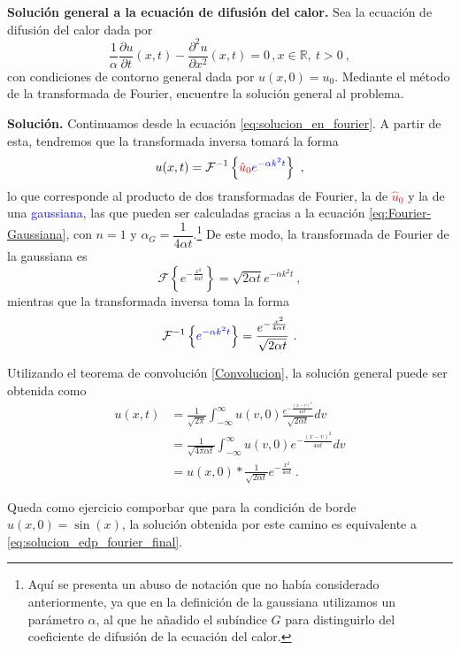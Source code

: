 \begin{ejemplo}
    \textbf{Solución general a la ecuación de difusión del calor.} Sea la ecuación de difusión del calor dada por
    \begin{equation}
        \frac{1}{\alpha} \frac{\partial u}{\partial t} (x,t) - \frac{\partial^2 u}{\partial x^2}(x,t) = 0 \, , x \in \mathbb{R}, \ t>0 \ ,
    \end{equation}
    con condiciones de contorno general dada por $u(x,0) = u_0$. Mediante el método de la transformada de Fourier, encuentre la solución general al problema.

    \textbf{Solución.} Continuamos desde la ecuación \eqref{eq:solucion_en_fourier}. A partir de esta, tendremos que la transformada inversa tomará la forma
    \begin{equation}
        u(x,t) = \mathcal{F}^{-1} \left\{ \textcolor{red}{\hat{u}_0} \textcolor{blue}{e^{-\alpha k^2 t}} \right\} \ ,
    \end{equation}
    lo que corresponde al producto de dos transformadas de Fourier, la de \textcolor{red}{$\hat{u}_0$} y la de una \textcolor{blue}{gaussiana}, las que pueden ser calculadas gracias a la ecuación \eqref{eq:Fourier-Gaussiana}, con $n=1$ y $\alpha_G = \dfrac{1}{4\alpha t}$.\footnote{Aquí se presenta un abuso de notación que no había considerado anteriormente, ya que en la definición de la gaussiana utilizamos un parámetro $\alpha$, al que he añadido el subíndice $G$ para distinguirlo del coeficiente de difusión de la ecuación del calor.} 
    De este modo, la transformada de Fourier de la gaussiana es
    \begin{equation}
        \mathcal{F}\left\{ e^{-\frac{x^2}{4\alpha t}} \right\} = \sqrt{2\alpha t} e^{-\alpha k^2 t} \ ,
    \end{equation}
    mientras que la transformada inversa toma la forma 
    \begin{equation}
        \mathcal{F}^{-1}\left\{ \textcolor{blue}{e^{-\alpha k^2 t}} \right\} = \frac{e^{-\frac{x^2}{4\alpha t}}}{\sqrt{2\alpha t}}  \ .
    \end{equation}

    Utilizando el teorema de convolución \eqref{Convolucion}, la solución general puede ser obtenida como
    \begin{align}
        u(x,t) & = \frac{1}{\sqrt{2\pi}} \int_{-\infty}^\infty u(v,0) \frac{e^{- \frac{(x-v)^2}{4\alpha t}}}{\sqrt{2\alpha t}} dv \\
        & = \frac{1}{\sqrt{4\pi \alpha t}} \int_{-\infty}^\infty u(v,0) e^{- \frac{(x-v)^2}{4\alpha t}} dv \\
        & = u(x,0) \ast \frac{1}{\sqrt{2\alpha t}}e^{-\frac{x^2}{4\alpha t}} \ .
    \end{align}

    Queda como ejercicio comporbar que para la condición de borde $u(x,0) = \sin(x)$, la solución obtenida por este camino es equivalente a \eqref{eq:solucion_edp_fourier_final}.
\end{ejemplo}